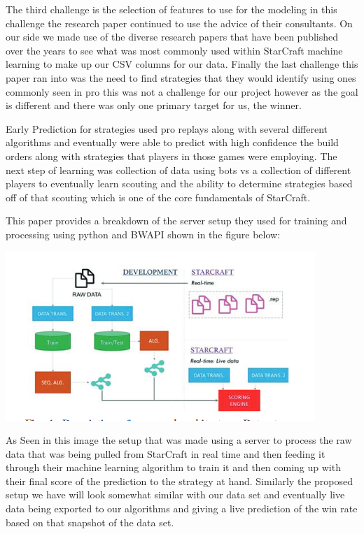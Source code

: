 \documentclass[a4paper,12pt]{report}
\begin{document}
The third challenge is the selection of features to use for the modeling in this challenge the research paper continued to use the advice of their consultants. On our side we made use of the diverse research papers that have been published over the years to see what was most commonly used within StarCraft machine learning to make up our CSV columns for our data. Finally the last challenge this paper ran into was the need to find strategies that they would identify using ones commonly seen in pro this was not a challenge for our project however as the goal is different and there was only one primary target for us, the winner.

Early Prediction for strategies used pro replays along with several different algorithms and eventually were able to predict with high confidence the build orders along with strategies that players in those games were employing. The next step of learning was collection of data using bots vs a collection of different players to eventually learn scouting and the ability to determine strategies based off of that scouting which is one of the core fundamentals of StarCraft.

This paper provides a breakdown of the server setup they used for training and processing using python and BWAPI shown in the figure below:

\begin{center}
    \captionsetup{type=figure}
    \includegraphics[width=.9\linewidth]{media/TestingServerCycle.png}
\end{center}

As Seen in this image the setup that was made using a server to process the raw data that was being pulled from StarCraft in real time and then feeding it through their machine learning algorithm to train it and then coming up with their final score of the prediction to the strategy at hand. Similarly the proposed setup we have will look somewhat similar with our data set and eventually live data being exported to our algorithms and giving a live prediction of the win rate based on that snapshot of the data set.
\end{document}
